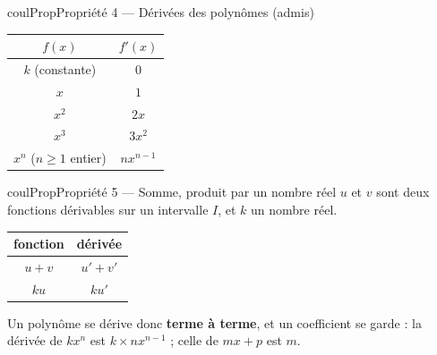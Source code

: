 \documentclass[11pt,a4paper]{article}
\makeatletter
\renewcommand{\ge}{\geqslant}
\newcounter{lycee@signet}
\newcommand{\signet}[3][]{\stepcounter{lycee@signet}%
  \edef\lycee@dest{\if\relax\detokenize{#1}\relax
    signet.\arabic{lycee@signet}\else#1\fi}%
  \hypertarget{\lycee@dest}{}\bookmark[level=#2,dest=\lycee@dest]{#3}}
\newenvironment{proprietebox}[1][Propriété]%
  {\begin{boitecours}[phantom={\signet{2}{#1}}]{coulProp}{#1}}{\end{boitecours}}
\makeatother
\begin{document}
\begin{proprietebox}[Propriété 4 --- Dérivées des polynômes (admis)]
\begin{center}
\renewcommand{\arraystretch}{1.8}\setlength{\tabcolsep}{14pt}
\begin{tabular}{|c|c|}
\hline
$f(x)$ & $f'(x)$\\ \hline
$k$ (constante) & $0$\\ \hline
$x$ & $1$\\ \hline
$x^{2}$ & $2x$\\ \hline
$x^{3}$ & $3x^{2}$\\ \hline
$x^{n}$ ($n\ge 1$ entier) & $nx^{n-1}$\\ \hline
\end{tabular}
\end{center}
\end{proprietebox}

\begin{proprietebox}[Propriété 5 --- Somme, produit par un nombre réel]
$u$ et $v$ sont deux fonctions dérivables sur un intervalle $I$, et $k$ un nombre réel.
\begin{center}
\renewcommand{\arraystretch}{1.8}\setlength{\tabcolsep}{14pt}
\begin{tabular}{|c|c|}
\hline
fonction & dérivée\\ \hline
$u+v$ & $u'+v'$\\ \hline
$ku$ & $ku'$\\ \hline
\end{tabular}
\end{center}
Un polynôme se dérive donc \textbf{terme à terme}, et un coefficient se garde :
la dérivée de $kx^{n}$ est $k\times nx^{n-1}$ ; celle de $mx+p$ est $m$.
\end{proprietebox}
\end{document}
